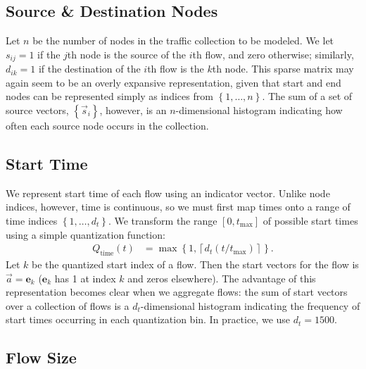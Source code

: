 \documentclass[twocolumn,final]{svjour3}
\newcommand{\Qt}{Q_{\text{time}}}
\newcommand{\set}[1]{\left\{#1\right\}}
\newcommand{\ceil}[1]{\left\lceil#1\right\rceil}
\newcommand{\fracpx}[2]{(#1/#2)}
\begin{document}
\subsection{Source \& Destination Nodes}

Let $n$ be the number of nodes in the traffic collection to be modeled. We let $s_{ij}=1$ if the $j$th node is the source of the $i$th flow, and zero otherwise; similarly, $d_{ik}=1$ if the destination of the $i$th flow is the $k$th node. This sparse matrix may again seem to be an overly expansive representation, given that start and end nodes can be represented simply as indices from $\set{1,\dots,n}$. The sum of a set of source vectors, $\set{\vec{s}_i}$, however, is an $n$-dimensional histogram indicating how often each source node occurs in the collection.

\subsection{Start Time}

We represent start time of each flow using an indicator vector. Unlike node indices, however, time is continuous, so we must first map times onto a range of time indices $\set{1,\dots,d_t}$. We transform the range $[0,t_{\max}]$ of possible start times using a simple quantization function:
\begin{align}
\label{eqn:time-quantization}
\Qt(t) &= \max\set{1,\ceil{d_t\fracpx{t}{t_{\max}}}}.
\end{align}
Let $k$ be the quantized start index of a flow. Then the start vectors for the flow is $\vec{a}=\mathbf{e}_k$ ($\mathbf{e}_k$ has 1 at index $k$ and zeros elsewhere). The advantage of this representation becomes clear when we aggregate flows: the sum of start vectors over a collection of flows is a $d_t$-dimensional histogram indicating the frequency of start times occurring in each quantization bin. In practice, we use $d_t=1500$.

\subsection{Flow Size}
\end{document}
